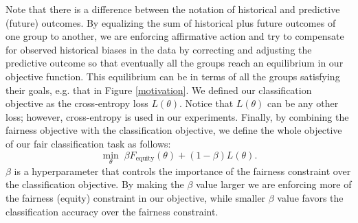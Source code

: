 Note that there is a difference between the notation of historical and predictive (future) outcomes. By equalizing the sum of historical plus future outcomes of one group to another, we are enforcing affirmative action and try to compensate for observed historical biases in the data by correcting and adjusting the predictive outcome so that eventually all the groups reach an equilibrium in our objective function. This equilibrium can be in terms of all the groups satisfying their goals, e.g. that in Figure \ref{motivation}. 
We defined our classification objective as the cross-entropy loss $L(\theta)$.
Notice that $L(\theta)$ can be any other loss; however, cross-entropy is used in our experiments. 
Finally, by combining the fairness objective with the classification objective, we define the whole objective of our fair classification task as follows: \\
\begin{equation}
     \min_\theta \; \beta F_\text{equity}(\theta)+ (1-\beta)L(\theta).
     \label{equity_eq}
\end{equation}
$\beta$ is a hyperparameter that controls the importance of the fairness constraint over the classification objective. By making the $\beta$ value larger we are enforcing more of the fairness (equity) constraint in our objective, while smaller $\beta$ value favors the classification accuracy over the fairness constraint.
